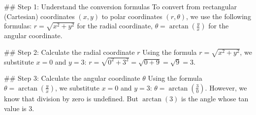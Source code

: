 ## Step 1: Understand the conversion formulas
To convert from rectangular (Cartesian) coordinates $(x, y)$ to polar coordinates $(r, \theta)$, we use the following formulas:
$r = \sqrt{x^2 + y^2}$ for the radial coordinate,
$\theta = \arctan\left(\frac{y}{x}\right)$ for the angular coordinate.

## Step 2: Calculate the radial coordinate $r$
Using the formula $r = \sqrt{x^2 + y^2}$, we substitute $x = 0$ and $y = 3$:
$r = \sqrt{0^2 + 3^2} = \sqrt{0 + 9} = \sqrt{9} = 3$.

## Step 3: Calculate the angular coordinate $\theta$
Using the formula $\theta = \arctan\left(\frac{y}{x}\right)$, we substitute $x = 0$ and $y = 3$:
$\theta = \arctan\left(\frac{3}{0}\right)$.
However, we know that division by zero is undefined. But $\arctan(3)$ is the angle whose tan value is 3.


